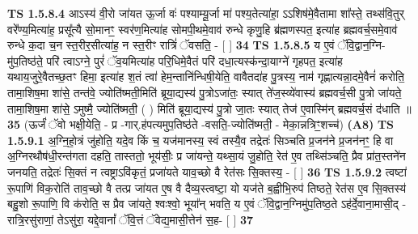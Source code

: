 \documentclass[17pt]{extarticle}
\begin{document}
                  \newline
                                \textbf{ TS 1.5.8.4} \newline
                  आऽस्य॑ वी॒रो जा॑यत ऊ॒र्जा वः॑ पश्याम्यू॒र्जा मा॑ पश्य॒तेत्या॑हा॒ ऽऽशिष॑मे॒वैतामा शा᳚स्ते॒ तथ्स॑वि॒तुर् वरे᳚ण्य॒मित्या॑ह॒ प्रसू᳚त्यै सो॒मानꣳ॒॒ स्वर॑ण॒मित्या॑ह सोमपी॒थमे॒वाव॑ रुन्धे कृणु॒हि ब्र॑ह्मणस्पत॒ इत्या॑ह ब्रह्मवर्च॒समे॒वाव॑ रुन्धे क॒दा च॒न स्त॒रीर॒सीत्या॑ह॒ न स्त॒रीꣳ रात्रिं॑ ॅवसति॒ - [ ] \textbf{  34} \newline
                  \newline
                                \textbf{ TS 1.5.8.5} \newline
                  य ए॒वं ॅवि॒द्वान॒ग्नि-मु॑प॒तिष्ठ॑ते॒ परि॑ त्वाऽग्ने॒ पुरं॑ ॅव॒यमित्या॑ह परि॒धिमे॒वैतं परि॑ दधा॒त्यस्क॑न्दा॒याग्ने॑ गृहपत॒ इत्या॑ह यथाय॒जुरे॒वैतच्छ॒तꣳ हिमा॒ इत्या॑ह श॒तं त्वा॑ हेम॒न्तानि॑न्धिषी॒येति॒ वावैतदा॑ह पु॒त्रस्य॒ नाम॑ गृह्णात्यन्ना॒दमे॒वैनं॑ करोति॒ तामा॒शिष॒मा शा॑से॒ तन्त॑वे॒ ज्योति॑ष्मती॒मिति॑ ब्रूया॒द्यस्य॑ पु॒त्रोऽजा॑तः॒ स्यात् ते॑ज॒स्व्ये॑वास्य॑ ब्रह्मवर्च॒सी पु॒त्रो जा॑यते॒ तामा॒शिष॒मा शा॑से॒ ऽमुष्मै॒ ज्योति॑ष्मती॒ ( ) मिति॑ ब्रूया॒द्यस्य॑ पु॒त्रो जा॒तः स्यात् तेज॑ ए॒वास्मि॑न् ब्रह्मवर्च॒सं द॑धाति ॥ \textbf{  35} \newline
                  \newline
                      (ऊर्जं॑ ॅवो भक्षी॒येति॒ - प्र -गार्.ह॑पत्यमुप॒तिष्ठ॑ते -वसति॒-ज्योति॑ष्मती॒ - मेका॒न्नत्रिꣳ॒॒शच्च॑)  \textbf{(A8)} \newline \newline
                                        \textbf{ TS 1.5.9.1} \newline
                  अ॒ग्नि॒हो॒त्रं जु॑होति॒ यदे॒व किं च॒ यज॑मानस्य॒ स्वं तस्यै॒व तद्रेतः॑ सिञ्चति प्र॒जन॑ने प्र॒जन॑नꣳ॒॒ हि वा अ॒ग्निरथौष॑धी॒रन्त॑गता दहति॒ तास्ततो॒ भूय॑सीः॒ प्र जा॑यन्ते॒ यथ्सा॒यं जु॒होति॒ रेत॑ ए॒व तथ्सि॑ञ्चति॒ प्रैव प्रा॑त॒स्तने॑न जनयति॒ तद्रेतः॑ सि॒क्तं न त्वष्ट्राऽवि॑कृतं॒ प्रजा॑यते याव॒च्छो वै रेत॑सः सि॒क्तस्य॒ - [ ] \textbf{  36} \newline
                  \newline
                                \textbf{ TS 1.5.9.2} \newline
                  त्वष्टा॑ रू॒पाणि॑ विक॒रोति॑ ताव॒च्छो वै तत्प्र जा॑यत ए॒ष वै दैव्य॒स्त्वष्टा॒ यो यज॑ते ब॒ह्वीभि॒रुप॑ तिष्ठते॒ रेत॑स ए॒व सि॒क्तस्य॑ बहु॒शो रू॒पाणि॒ वि क॑रोति॒ स प्रैव जा॑यते॒ श्वःश्वो॒ भूया᳚न् भवति॒ य ए॒वं ॅवि॒द्वान॒ग्निमु॑प॒तिष्ठ॒ते ऽह॑र्दे॒वाना॒मासी॒द् - रात्रि॒रसु॑राणां॒ तेऽसु॑रा॒ यद्दे॒वानां᳚ ॅवि॒त्तं ॅवेद्य॒मासी॒त्तेन॑ स॒ह- [ ] \textbf{  37} \newline
\end{document}
